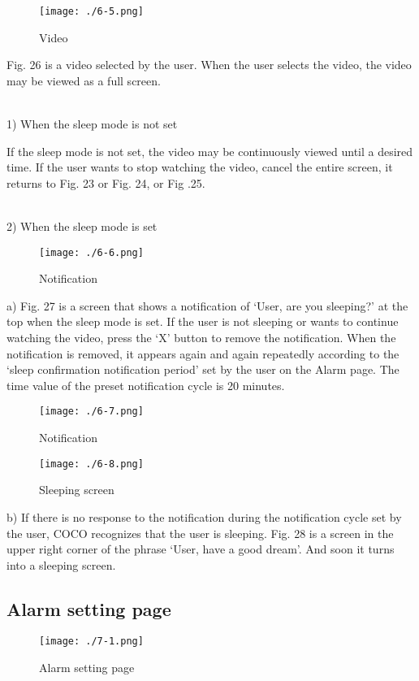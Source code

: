 \documentclass[conference]{IEEEtran}
\begin{document}
\begin{figure}[H]
\texttt{[image: ./6-5.png]}
\centering
\caption{Video}
\end{figure}

Fig. 26 is a video selected by the user. When the user selects the video, the video may be viewed as a full screen.

\\1) When the sleep mode is not set

    If the sleep mode is not set, the video may be continuously viewed until a desired time. If the user wants to stop watching the video, cancel the entire screen, it returns to Fig. 23 or Fig. 24, or Fig .25.

\\2) When the sleep mode is set
\begin{figure}[H]
\texttt{[image: ./6-6.png]}
\centering
\caption{Notification}
\end{figure}
        a) Fig. 27 is a screen that shows a notification of ‘User, are you sleeping?’ at the top when the sleep mode is set. If the user is not sleeping or wants to continue watching the video, press the ‘X’ button to remove the notification. When the notification is removed, it appears again and again repeatedly according to the ‘sleep confirmation notification period’ set by the user on the Alarm page. The time value of the preset notification cycle is 20 minutes.
    

\begin{figure}[H]
\texttt{[image: ./6-7.png]}
\centering
\caption{Notification}
\end{figure}

\begin{figure}[H]
\texttt{[image: ./6-8.png]}
\centering
\caption{Sleeping screen}
\end{figure}

        b) If there is no response to the notification during the notification cycle set by the user, COCO recognizes that the user is sleeping. Fig. 28 is a screen in the upper right corner of the phrase ‘User, have a good dream’. And soon it turns into a sleeping screen.
        
\subsection{Alarm setting page}
\begin{figure}[H]
\texttt{[image: ./7-1.png]}
\centering
\caption{Alarm setting page}
\end{figure}
\end{document}
